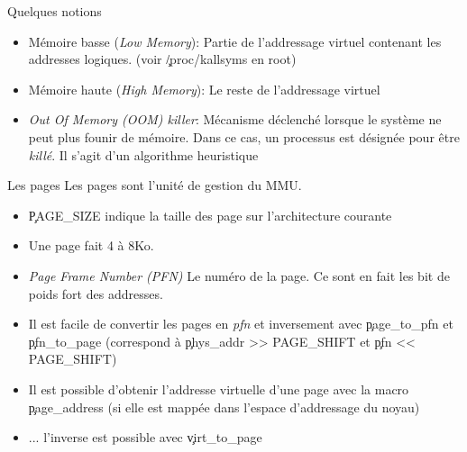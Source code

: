 \begin{frame}[fragile=singleslide]{Quelques notions}
  \begin{itemize} 
  \item  Mémoire  basse (\emph{Low  Memory}):  Partie de  l'addressage
    virtuel contenant les addresses logiques. (voir \c{/proc/kallsyms}
    en root)
  \item Mémoire  haute (\emph{High Memory}): Le  reste de l'addressage
    virtuel
  \item \emph{Out Of Memory (OOM) killer}: Mécanisme déclenché lorsque
    le  système  ne peut  plus  founir de  mémoire.  Dans  ce cas,  un
    processus  est désignée  pour  être \emph{killé}.  Il s'agit  d'un
    algorithme heuristique
  \end{itemize}     
\end{frame} 

\begin{frame}[fragile=singleslide]{Les pages}
  Les pages sont l'unité de gestion du MMU. 
  \begin{itemize} 
  \item \c{PAGE_SIZE}  indique la  taille des page  sur l'architecture
    courante
  \item Une page fait 4 à 8Ko.
  \item \emph{Page Frame  Number (PFN)} Le numéro de  la page. Ce sont
    en fait les bit de poids fort des addresses.
  \item  Il  est  facile  de  convertir les  pages  en  \emph{pfn}  et
    inversement avec \c{page_to_pfn}  et \c{pfn_to_page} (correspond à
    \c{phys_addr >> PAGE_SHIFT} et \c{pfn << PAGE_SHIFT})
  \item Il est possible d'obtenir l'addresse virtuelle d'une page avec
    la  macro  \c{page_address}  (si  elle est  mappée  dans  l'espace
    d'addressage du noyau)
  \item ... l'inverse est possible avec \c{virt_to_page}
  \end{itemize}
\end{frame}


